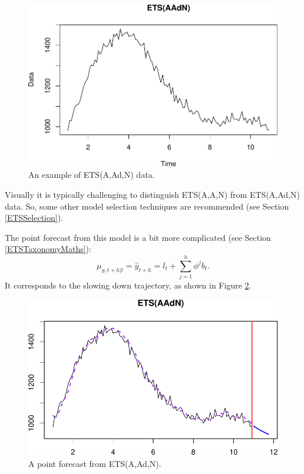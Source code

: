 \documentclass[
]{book}
\theoremstyle{definition}
\theoremstyle{definition}
\theoremstyle{definition}
\theoremstyle{definition}
\theoremstyle{remark}
\begin{document}
\begin{figure}
\centering
\includegraphics{Svetunkov--2022----ADAM_files/figure-latex/ETSAAdNExample-1.pdf}
\caption{\label{fig:ETSAAdNExample}An example of ETS(A,Ad,N) data.}
\end{figure}

Visually it is typically challenging to distinguish ETS(A,A,N) from ETS(A,Ad,N) data. So, some other model selection techniques are recommended (see Section \ref{ETSSelection}).

The point forecast from this model is a bit more complicated (see Section \ref{ETSTaxonomyMaths}):
\begin{equation}
    \mu_{y,t+h|t} = \hat{y}_{t+h} = l_{t} + \sum_{j=1}^h \phi^j b_t.
  \label{eq:ETSAAdNForecast}
\end{equation}
It corresponds to the slowing down trajectory, as shown in Figure \ref{fig:ETSAAdNExampleForecast}.

\begin{figure}
\centering
\includegraphics{Svetunkov--2022----ADAM_files/figure-latex/ETSAAdNExampleForecast-1.pdf}
\caption{\label{fig:ETSAAdNExampleForecast}A point forecast from ETS(A,Ad,N).}
\end{figure}
\end{document}
